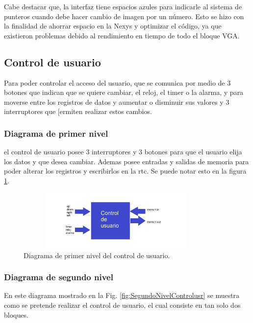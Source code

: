 \documentclass[12pt,a4paper]{article}
\begin{document}
		Cabe destacar que, la interfaz tiene espacios azules para indicarle al sistema de punteros cuando debe hacer cambio de imagen por un número. Esto se hizo con la finalidad de ahorrar espacio en la Nexys y optimizar el código, ya que existieron problemas debido al rendimiento en tiempo de todo el bloque VGA.\\[2ex]
		
		\subsection{Control de usuario}
		Para poder controlar el acceso del usuario, que se comunica por medio de 3 botones que indican que se quiere cambiar, el reloj, el timer o la alarma, y para moverse entre los registros de datos y aumentar o disminuir sus valores y 3 interruptores que [ermiten realizar estos cambios.\\ 
		
		\subsubsection{Diagrama de primer nivel}
		el control de usuario posee 3 interruptores y 3 botones para que el usuario elija los datos y que desea cambiar. Ademas posee entradas y salidas de memoria para poder alterar los registros y escribirlos en la rtc. Se puede notar esto en la figura \ref{fig:PrimerNivelcontrolusr}.
		
		\begin{figure}[htbp]
			\centering
			\includegraphics[height=3cm, width=10cm]{img/nivel1_contusr.jpg}
			\caption[1erNivel]{Diagrama de primer nivel del control de usuario.}
			\label{fig:PrimerNivelcontrolusr}
		\end{figure}
		
		\subsubsection{Diagrama de segundo nivel}
		En este diagrama mostrado en la Fig. \ref{fig:SegundoNivelControlusr} se muestra como se pretende realizar el control de usuario, el cual consiste en tan solo dos bloques.\\[2ex]
		
\end{document}
